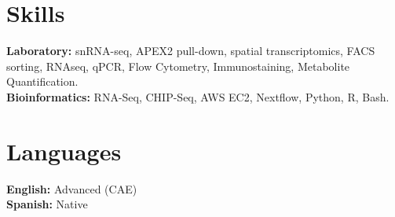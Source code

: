 \documentclass[a4paper,10pt]{article}
\begin{document}
\vspace{10pt}

\section*{Skills}

\noindent\textbf{Laboratory:} snRNA-seq, APEX2 pull-down, spatial transcriptomics, FACS sorting, RNAseq, qPCR, Flow Cytometry, Immunostaining, Metabolite Quantification. \\
\textbf{Bioinformatics:} RNA-Seq, CHIP-Seq, AWS EC2, Nextflow, Python, R, Bash.

\vspace{10pt}

\section*{Languages}

\noindent\textbf{English:} Advanced (CAE) \\
\textbf{Spanish:} Native
\end{document}
